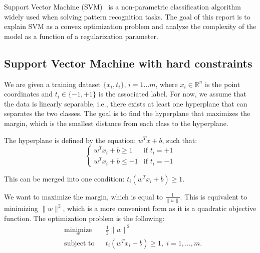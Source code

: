 \label{sec:intro}

Support Vector Machine (SVM)~\cite{cortes1995support} is a non-parametric classification algorithm widely used when solving pattern recognition tasks. The goal of this report is to explain SVM as a convex optimization problem and analyze the complexity of the model as a function of a regularization parameter.
\subsection{Support Vector Machine with hard constraints}
We are given a training dataset $\{x_i, t_i\}$, $i=1\ldots m$, where $x_i \in \mathbb{R}^n$ is the point coordinates and  $t_i \in \{-1,+1 \}$ is the associated label. For now, we assume that the data is linearly separable, i.e., there exists at least one hyperplane that can separates the two classes. The goal is to find the hyperplane that maximizes the margin, which is the smallest distance from each class to the hyperplane.

The hyperplane is defined by the equation: $w^Tx+b$, such that:
\[
  \begin{cases} 
   w^Tx_i+b \geq 1 & \text{if } t_i=+1 \\
   w^Tx_i+b \leq -1       & \text{if } t_i=-1
  \end{cases}
\]

This can be merged into one condition: $ t_i(w^Tx_i+b) \geq 1$.

We want to maximize the margin, which is equal to $\frac{1}{\|w\|}$. This is equivalent to minimizing $\|w\|^2$, which is a more convenient form as it is a quadratic objective function. The optimization problem is the following:
\begin{equation}
\begin{aligned}
& \underset{w}{\text{minimize}}
& & \frac{1}{2}\|w\|^2 \\
& \text{subject to}
& & t_i(w^Tx_i+b) \geq 1, \; i = 1, \ldots, m.
\label{eq:svm_hard}
\end{aligned}
\end{equation}

